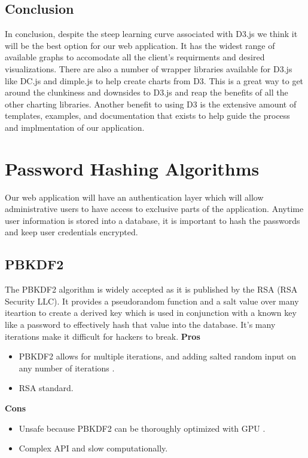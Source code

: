 \documentclass[onecolumn, draftclsnofoot,10pt, compsoc]{IEEEtran}
\begin{document}
\subsection{Conclusion}
In conclusion, despite the steep learning curve associated with D3.js we think it will be the best option for our web application. It has the widest range of available graphs to accomodate all the client's requirments and desired visualizations. There are also a number of wrapper libraries available for D3.js like DC.js and dimple.js to help create charts from D3. This is a great way to get around the clunkiness and downsides to D3.js and reap the benefits of all the other charting libraries. Another benefit to using D3 is the extensive amount of templates, examples, and documentation that exists to help guide the process and implmentation of our application.
\section{Password Hashing Algorithms}
Our web application will have an authentication layer which will allow administrative users to have access to exclusive parts of the application. Anytime user information is stored into a database, it is important to hash the passwords and keep user credentials encrypted.
\subsection{PBKDF2}
The PBKDF2 algorithm is widely accepted as it is published by the RSA (RSA Security LLC). It provides a pseudorandom function and a salt value over many iteartion to create a derived key which is used in conjunction with a known key like a password to effectively hash that value into the database. It's many iterations make it difficult for hackers to break.
\textbf{Pros}
\begin{itemize}
    \item PBKDF2 allows for multiple iterations, and adding salted random input on any number of iterations \cite{jarmoc_2015}.
    \item RSA standard.    
\end{itemize}
\textbf{Cons}
\begin{itemize}
    \item Unsafe because PBKDF2 can be thoroughly optimized with GPU \cite{pornin_2012}.
    \item Complex API and slow computationally.
\end{itemize}
\end{document}
